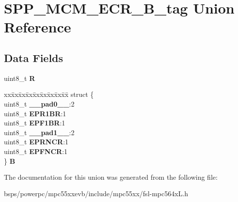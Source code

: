 \hypertarget{unionSPP__MCM__ECR__8B__tag}{}\section{S\+P\+P\+\_\+\+M\+C\+M\+\_\+\+E\+C\+R\+\_\+B\+\_\+tag Union Reference}
\label{unionSPP__MCM__ECR__8B__tag}
\subsection*{Data Fields}
\begin{DoxyCompactItemize}
\item 
\mbox{\label{unionSPP__MCM__ECR__8B__tag_a7f2dcf1f68a5002ad3125f8339197c8d}} 
uint8\+\_\+t {\bfseries R}
\item 
\mbox{\label{unionSPP__MCM__ECR__8B__tag_a6e4af1877c5863e64975cce99f5ed1b5}} 
\begin{tabbing}
xx\=xx\=xx\=xx\=xx\=xx\=xx\=xx\=xx\=\kill
struct \{\\
\>uint8\_t {\bfseries \_\_pad0\_\_}:2\\
\>uint8\_t {\bfseries EPR1BR}:1\\
\>uint8\_t {\bfseries EPF1BR}:1\\
\>uint8\_t {\bfseries \_\_pad1\_\_}:2\\
\>uint8\_t {\bfseries EPRNCR}:1\\
\>uint8\_t {\bfseries EPFNCR}:1\\
\} {\bfseries B}\\

\end{tabbing}\end{DoxyCompactItemize}


The documentation for this union was generated from the following file\+:\begin{DoxyCompactItemize}
\item 
bsps/powerpc/mpc55xxevb/include/mpc55xx/fsl-\/mpc564x\+L.\+h\end{DoxyCompactItemize}
